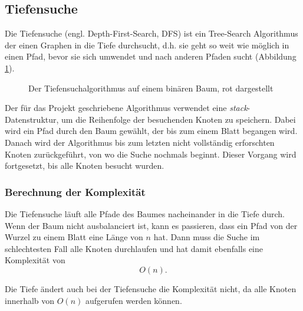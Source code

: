 \documentclass[a4paper,11pt]{article}
\begin{document}
\subsection{Tiefensuche}

Die Tiefensuche (engl. Depth-First-Search, DFS) ist ein Tree-Search Algorithmus der einen Graphen in die Tiefe durchsucht, d.h. sie geht so weit wie möglich in einen Pfad, bevor sie sich umwendet und nach anderen Pfaden sucht (Abbildung \ref{fig:binary_tree_dfs}).

\begin{figure}[htbp]
\centering
{}
\caption{Der Tiefensuchalgorithmus auf einem binären Baum, rot dargestellt}
\label{fig:binary_tree_dfs}
\end{figure}

Der für das Projekt geschriebene Algorithmus verwendet eine \emph{stack}-Datenstruktur, um die Reihenfolge der besuchenden Knoten zu speichern. Dabei wird ein Pfad durch den Baum gewählt, der bis zum einem Blatt begangen wird. Danach wird der Algorithmus bis zum letzten nicht vollständig erforschten Knoten zurückgeführt, von wo die Suche nochmals beginnt. Dieser Vorgang wird fortgesetzt, bis alle Knoten besucht wurden.

\subsubsection{Berechnung der Komplexität}

Die Tiefensuche läuft alle Pfade des Baumes nacheinander in die Tiefe durch. Wenn der Baum nicht ausbalanciert ist, kann es passieren, dass ein Pfad von der Wurzel zu einem Blatt eine Länge von $n$ hat. Dann muss die Suche im schlechtesten Fall alle Knoten durchlaufen und hat damit ebenfalls eine Komplexität von $$O(n).$$

Die Tiefe ändert auch bei der Tiefensuche die Komplexität nicht, da alle Knoten innerhalb von $O(n)$ aufgerufen werden können.
\end{document}

